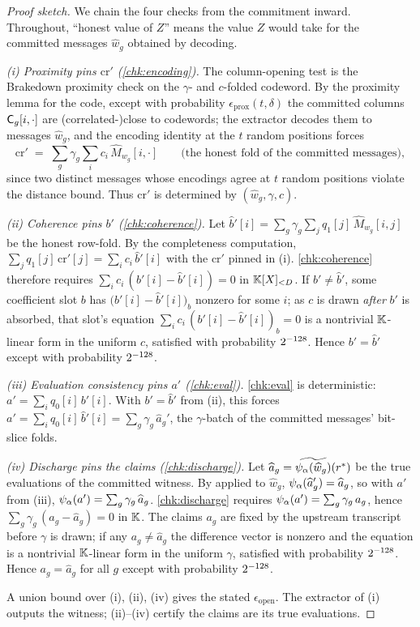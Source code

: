 \begin{proof}[Proof sketch]
We chain the four checks from the commitment inward. Throughout,
``honest value of $Z$'' means the value $Z$ would take for the committed
messages $\widehat w_g$ obtained by decoding.

\emph{(i) Proximity pins $\mathrm{cr}'$ (\ref{chk:encoding}).} The column-opening
test is the Brakedown proximity check on the $\gamma$- and $c$-folded
codeword. By the proximity lemma for the code, except with probability
$\epsilon_{\mathrm{prox}}(t,\delta)$ the committed columns
$\mathsf{C}_g[i,\cdot]$ are (correlated-)close to codewords; the extractor
decodes them to messages $\widehat w_g$, and the encoding identity at the
$t$ random positions forces
\[
  \mathrm{cr}' \;=\; \sum_g \gamma_g \sum_i c_i\,\widehat M_{w_g}[i,\cdot]
  \qquad\text{(the honest fold of the committed messages)},
\]
since two distinct messages whose encodings agree at $t$ random positions
violate the distance bound. Thus $\mathrm{cr}'$ is determined by
$(\widehat w_g, \gamma, c)$.

\emph{(ii) Coherence pins $b'$ (\ref{chk:coherence}).} Let
$\widehat b'[i] = \sum_g \gamma_g \sum_j q_1[j]\,\widehat M_{w_g}[i,j]$ be
the honest row-fold. By the completeness computation,
$\sum_j q_1[j]\,\mathrm{cr}'[j] = \sum_i c_i\,\widehat b'[i]$ with the
$\mathrm{cr}'$ pinned in (i). \ref{chk:coherence} therefore requires
$\sum_i c_i\,(b'[i]-\widehat b'[i]) = 0$ in $\mathbb{K}[X]_{<D}$. If
$b' \ne \widehat b'$, some coefficient slot $b$ has
$\bigl(b'[i]-\widehat b'[i]\bigr)_b$ nonzero for some $i$; as $c$ is drawn
\emph{after} $b'$ is absorbed, that slot's equation
$\sum_i c_i\,(b'[i]-\widehat b'[i])_b = 0$ is a nontrivial $\mathbb{K}$-linear
form in the uniform $c$, satisfied with probability $2^{-128}$. Hence
$b' = \widehat b'$ except with probability $2^{-128}$.

\emph{(iii) Evaluation consistency pins $a'$ (\ref{chk:eval}).} \ref{chk:eval} is
deterministic: $a' = \sum_i q_0[i]\,b'[i]$. With $b'=\widehat b'$ from
(ii), this forces $a' = \sum_i q_0[i]\,\widehat b'[i] = \sum_g \gamma_g\,
\widehat a_g'$, the $\gamma$-batch of the committed messages' bit-slice
folds.

\emph{(iv) Discharge pins the claims (\ref{chk:discharge}).} Let
$\widehat a_g = \widetilde{\psi_{\alpha}(\widehat w_g)}(r^*)$ be the true evaluations of
the committed witness. By  applied to
$\widehat w_g$, $\psi_{\alpha}(\widehat a_g') = \widehat a_g$, so with $a'$ from
(iii), $\psi_{\alpha}(a') = \sum_g \gamma_g\,\widehat a_g$. \ref{chk:discharge} requires
$\psi_{\alpha}(a') = \sum_g \gamma_g\,a_g$, hence
$\sum_g \gamma_g\,(a_g - \widehat a_g) = 0$ in $\mathbb{K}$. The claims $a_g$ are
fixed by the upstream transcript before $\gamma$ is drawn; if any
$a_g \ne \widehat a_g$ the difference vector is nonzero and the equation
is a nontrivial $\mathbb{K}$-linear form in the uniform $\gamma$, satisfied with
probability $2^{-128}$. Hence $a_g = \widehat a_g$ for all $g$ except
with probability $2^{-128}$.

A union bound over (i), (ii), (iv) gives the stated
$\epsilon_{\mathrm{open}}$. The extractor of (i) outputs the witness; (ii)--(iv)
certify the claims are its true evaluations.
\end{proof}

